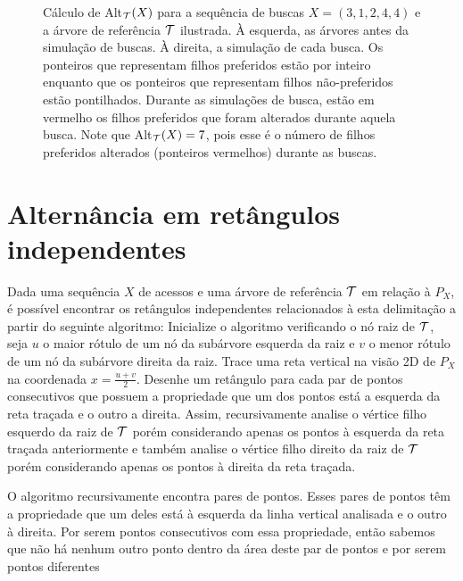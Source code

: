 \begin{figure}[H]
    
    \caption{Cálculo de Alt$_{\mathcal{T}}(X)$ para a sequência de buscas $X = (3,1,2,4,4)$ e a árvore de referência $\mathcal{T}$ ilustrada. À esquerda, as árvores antes da simulação de buscas. À direita, a simulação de cada busca. Os ponteiros que representam filhos preferidos estão por inteiro enquanto que os ponteiros que representam filhos não-preferidos estão pontilhados. Durante as simulações de busca, estão em vermelho os filhos preferidos que foram alterados durante aquela busca. Note que Alt$_{\mathcal{T}}(X) = 7$, pois esse é o número de filhos preferidos alterados (ponteiros vermelhos) durante as buscas.}
\label{fig:alternancia_abordagem_informal}
\end{figure}

\section{Alternância em retângulos independentes}

Dada uma sequência $X$ de acessos e uma árvore de referência $\mathcal{T}$ em relação à $P_X$, é possível encontrar os retângulos independentes relacionados à esta delimitação a partir do seguinte algoritmo: Inicialize o algoritmo verificando o nó raiz de $\mathcal{T}$, seja $u$ o maior rótulo de um nó da subárvore esquerda da raiz e $v$ o menor rótulo de um nó da subárvore direita da raiz. Trace uma reta vertical na visão 2D de $P_X$ na coordenada $x = \frac{u + v}{2}$. Desenhe um retângulo para cada par de pontos consecutivos que possuem a propriedade que um dos pontos está a esquerda da reta traçada e o outro a direita. Assim, recursivamente analise o vértice filho esquerdo da raiz de $\mathcal{T}$ porém considerando apenas os pontos à esquerda da reta traçada anteriormente e também analise o vértice filho direito da raiz de $\mathcal{T}$ porém considerando apenas os pontos à direita da reta traçada.

O algoritmo recursivamente encontra pares de pontos. Esses pares de pontos têm a propriedade que um deles está à esquerda da linha vertical analisada e o outro à direita. Por serem pontos consecutivos com essa propriedade, então sabemos que não há nenhum outro ponto dentro da área deste par de pontos e por serem pontos diferentes

